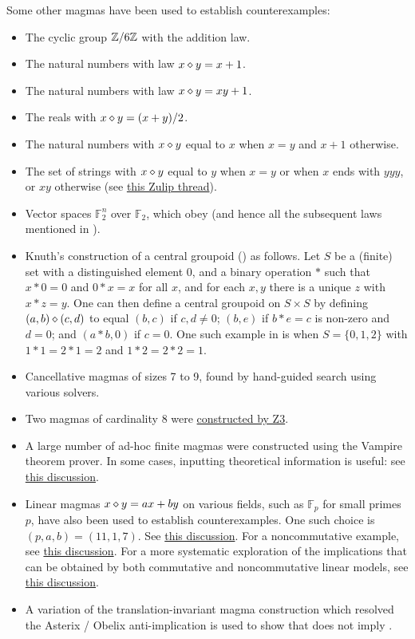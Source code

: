 Some other magmas have been used to establish counterexamples:
\begin{itemize}
  \item The cyclic group $\mathbb{Z}/6\mathbb{Z}$ with the addition law.
  \item The natural numbers with law $x \diamond y = x+1$.
  \item The natural numbers with law $x \diamond y = xy+1$.
  \item The reals with $x \diamond y = (x+y)/2$.
  \item The natural numbers with $x \diamond y$ equal to $x$ when $x=y$ and $x+1$ otherwise.
  \item The set of strings with $x \diamond y$ equal to $y$ when $x=y$ or when $x$ ends with $yyy$, or $xy$ otherwise (see \href{https://leanprover.zulipchat.com/#narrow/stream/458659-Equational/topic/3102.20does.20not.20imply.203176/near/474656031}{this Zulip thread}).
  \item Vector spaces ${\mathbb F}_2^n$ over ${\mathbb F}_2$, which obey  (and hence all the subsequent laws mentioned in ).
  \item Knuth's construction \cite{knuth} of a central groupoid () as follows.  Let $S$ be a (finite) set with a distinguished element $0$, and a binary operation $*$ such that $x*0=0$ and $0*x=x$   for all $x$, and for each $x,y$ there is a unique $z$ with $x*z=y$.  One can then define a central groupoid on $S \times S$ by defining $(a,b) \diamond (c,d)$ to equal $(b,c)$ if $c,d \neq 0$; $(b,e)$ if $b*e=c$ is non-zero and $d=0$; and $(a*b,0)$ if $c=0$.  One such example in \cite{knuth} is when $S = \{0,1,2\}$ with $1*1=2*1=2$ and $1*2=2*2=1$.
  \item Cancellative magmas of sizes 7 to 9, found by hand-guided search using various solvers.
  \item Two magmas of cardinality $8$ were \href{https://leanprover.zulipchat.com/#narrow/stream/458659-Equational/topic/using.20z3/near/474918100}{constructed by Z3}.
  \item A large number of ad-hoc finite magmas were constructed using the Vampire theorem prover.  In some cases, inputting theoretical information is useful: see \href{https://leanprover.zulipchat.com/#narrow/channel/458659-Equational/topic/Outstanding.20equations.2C.20v1/near/478066872}{this discussion}.
  \item Linear magmas $x\diamond y = ax+by$ on various fields, such as ${\mathbb F}_p$ for small primes $p$, have also been used to establish counterexamples.  One such choice is $(p,a,b) = (11,1,7)$. See \href{https://leanprover.zulipchat.com/#narrow/stream/458659-Equational/topic/An.20old.20new.20idea}{this discussion}.  For a noncommutative example, see \href{https://leanprover.zulipchat.com/#narrow/channel/458659-Equational/topic/Outstanding.20equations.2C.20v1/near/477928995.2E01}{this discussion}. For a more systematic exploration of the implications that can be obtained by both commutative and noncommutative linear models, see \href{https://leanprover.zulipchat.com/#narrow/channel/458659-Equational/topic/Non-commutative.20linear.20implications}{this discussion}.
  \item A variation of the translation-invariant magma construction which resolved the Asterix / Obelix anti-implication is used to show that  does not imply .
\end{itemize}
